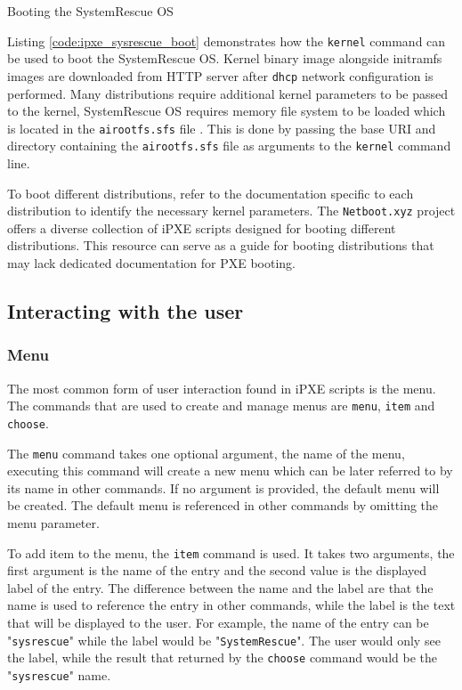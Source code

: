\documentclass[../main.tex]{subfiles}
\begin{document}
\begin{listing}[H]
  \caption{Booting the SystemRescue \cite{sysrescuecd} OS}
  \label{code:ipxe_sysrescue_boot}
\end{listing}

Listing \ref{code:ipxe_sysrescue_boot} demonstrates how the \texttt{kernel} command can be used to boot the SystemRescue OS.
Kernel binary image alongside initramfs images are downloaded from HTTP server after \texttt{dhcp} network configuration is performed.
Many distributions require additional kernel parameters to be passed to the kernel, SystemRescue OS requires
memory file system to be loaded which is located in the \texttt{airootfs.sfs} file \cite{systemrescue_airootfs_pxe}.
This is done by passing the base URI and directory containing the \texttt{airootfs.sfs} file as arguments to the \texttt{kernel} command line.


To boot different distributions, refer to the documentation specific to each distribution to identify the necessary kernel parameters.
The \texttt{Netboot.xyz} project \cite{netbootxyz} offers a diverse collection of iPXE scripts designed for booting different distributions.
This resource can serve as a guide for booting distributions that may lack dedicated documentation for PXE booting.

\subsection{Interacting with the user}

\subsubsection{Menu}

The most common form of user interaction found in iPXE scripts is the menu.
The commands that are used to create and manage menus are \texttt{menu}, \texttt{item} and \texttt{choose}.

The \texttt{menu} command takes one optional argument, the name of the menu, executing this command will create a new menu which can be later referred to by its name in other commands.
If no argument is provided, the default menu will be created. The default menu is referenced in other commands by omitting the menu parameter.


To add item to the menu, the \texttt{item} command is used. It takes two arguments, the first argument is the name of the entry and the second value is the displayed label of the entry.
The difference between the name and the label are that the name is used to reference the entry in other commands, while the label is the text that will be displayed to the user.
For example, the name of the entry can be "\texttt{sysrescue}" while the label would be "\texttt{SystemRescue}". The user would only see the label, while
the result that returned by the \texttt{choose} command would be the "\texttt{sysrescue}" name.
\end{document}
